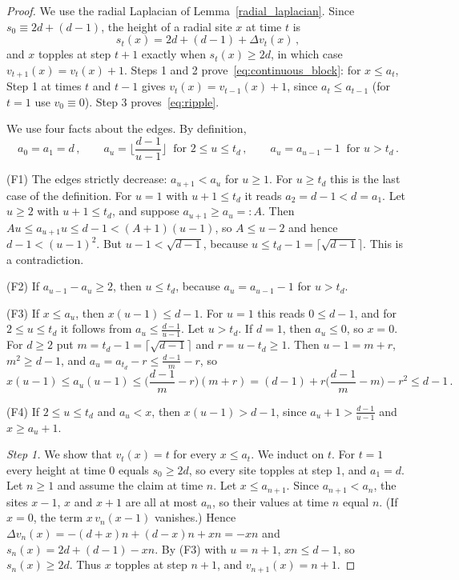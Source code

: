 \documentclass[12pt]{amsart}
\begin{document}
	\begin{proof}
        We use the radial Laplacian of Lemma~\ref{radial_laplacian}. Since $s_0\equiv 2d+(d-1)$, the height of a radial site $x$ at time $t$ is
        \begin{equation*}
        s_t(x)=2d+(d-1)+\Delta v_t(x)\,,
        \end{equation*}
        and $x$ topples at step $t+1$ exactly when $s_t(x)\geq 2d$, in which case $v_{t+1}(x)=v_t(x)+1$. Steps 1 and 2 prove~\eqref{eq:continuous_block}: for $x\leq a_t$, Step 1 at times $t$ and $t-1$ gives $v_t(x)=v_{t-1}(x)+1$, since $a_t\leq a_{t-1}$ (for $t=1$ use $v_0\equiv 0$). Step 3 proves~\eqref{eq:ripple}.

        We use four facts about the edges. By definition,
        \begin{equation*}
        a_0=a_1=d\,,\qquad a_u=\Big\lfloor\frac{d-1}{u-1}\Big\rfloor\ \text{ for } 2\leq u\leq t_d\,,\qquad a_u=a_{u-1}-1\ \text{ for } u>t_d\,.
        \end{equation*}

        (F1) The edges strictly decrease: $a_{u+1}<a_u$ for $u\geq 1$. For $u\geq t_d$ this is the last case of the definition. For $u=1$ with $u+1\leq t_d$ it reads $a_2=d-1<d=a_1$. Let $u\geq 2$ with $u+1\leq t_d$, and suppose $a_{u+1}\geq a_u=:A$. Then $Au\leq a_{u+1}u\leq d-1<(A+1)(u-1)$, so $A\leq u-2$ and hence $d-1<(u-1)^2$. But $u-1<\sqrt{d-1}$, because $u\leq t_d-1=\lceil\sqrt{d-1}\rceil$. This is a contradiction.

        (F2) If $a_{u-1}-a_u\geq 2$, then $u\leq t_d$, because $a_u=a_{u-1}-1$ for $u>t_d$.

        (F3) If $x\leq a_u$, then $x(u-1)\leq d-1$. For $u=1$ this reads $0\leq d-1$, and for $2\leq u\leq t_d$ it follows from $a_u\leq\frac{d-1}{u-1}$. Let $u>t_d$. If $d=1$, then $a_u\leq 0$, so $x=0$. For $d\geq 2$ put $m=t_d-1=\lceil\sqrt{d-1}\rceil$ and $r=u-t_d\geq 1$. Then $u-1=m+r$, $m^2\geq d-1$, and $a_u=a_{t_d}-r\leq\frac{d-1}{m}-r$, so
        \begin{equation*}
        x(u-1)\leq a_u(u-1)\leq\Big(\frac{d-1}{m}-r\Big)(m+r)=(d-1)+r\Big(\frac{d-1}{m}-m\Big)-r^2\leq d-1\,.
        \end{equation*}

        (F4) If $2\leq u\leq t_d$ and $a_u<x$, then $x(u-1)>d-1$, since $a_u+1>\frac{d-1}{u-1}$ and $x\geq a_u+1$.

        \emph{Step 1.} We show that $v_t(x)=t$ for every $x\leq a_t$. We induct on $t$. For $t=1$ every height at time $0$ equals $s_0\geq 2d$, so every site topples at step $1$, and $a_1=d$. Let $n\geq 1$ and assume the claim at time $n$. Let $x\leq a_{n+1}$. Since $a_{n+1}<a_n$, the sites $x-1$, $x$ and $x+1$ are all at most $a_n$, so their values at time $n$ equal $n$. (If $x=0$, the term $x\,v_n(x-1)$ vanishes.) Hence $\Delta v_n(x)=-(d+x)n+(d-x)n+xn=-xn$ and $s_n(x)=2d+(d-1)-xn$. By (F3) with $u=n+1$, $xn\leq d-1$, so $s_n(x)\geq 2d$. Thus $x$ topples at step $n+1$, and $v_{n+1}(x)=n+1$.


\end{proof}
\end{document}
